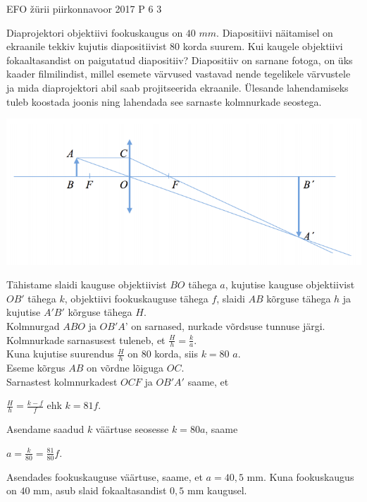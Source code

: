 {EFO žürii} %
{piirkonnavoor} %
{2017} %
{P 6} %
{3} %
{
\ifStatement
Diaprojektori objektiivi fookuskaugus on $40$ $mm$. Diapositiivi näitamisel on ekraanile tekkiv kujutis diapositiivist $80$ korda suurem. Kui kaugele objektiivi fokaaltasandist on paigutatud diapositiiv? Diapositiiv on sarnane fotoga, on üks kaader filmilindist, millel esemete värvused vastavad nende tegelikele värvustele ja mida diaprojektori abil saab projitseerida ekraanile.
\fi
\ifHint
Ülesande lahendamiseks tuleb koostada joonis ning lahendada see sarnaste kolmnurkade seostega.
\fi
\ifSolution
\begin{center}
	\includegraphics[width=0.5\linewidth]{2017-v2p-06-lah.PNG}
\end{center}
Tähistame slaidi kauguse objektiivist $BO$ tähega $a$, kujutise kauguse objektiivist $OB'$ tähega $k$, objektiivi fookuskauguse tähega $f$, slaidi $AB$ kõrguse tähega $h$ ja kujutise $A'B'$ kõrguse tähega $H$.\\
Kolmnurgad $ABO$ ja $OB'A$’ on sarnased, nurkade võrdsuse tunnuse järgi. \\
Kolmnurkade sarnasusest tuleneb, et $\frac{H}{h} = \frac{k}{a}$. \\
Kuna kujutise suurendus $\frac{H}{h}$ on $80$ korda, siis $k = 80$ $a$. \\
Eseme kõrgus $AB$ on võrdne lõiguga $OC$. \\
Sarnastest kolmnurkadest $OCF$ ja $OB'A'$  saame, et
\begin{center}
$\frac{H}{h} = \frac{k - f}{f}$ ehk $k = 81f$. 
\end{center}
Asendame saadud $k$ väärtuse seosesse $k = 80a$, saame 
\begin{center}
$a = \frac{k}{80} = \frac{81}{80}f$. 
\end{center}
Asendades fookuskauguse väärtuse, saame, et $a = 40,5$ mm. Kuna fookuskaugus on $40$ mm, asub slaid fokaaltasandist $0,5$ mm kaugusel.
\fi
}